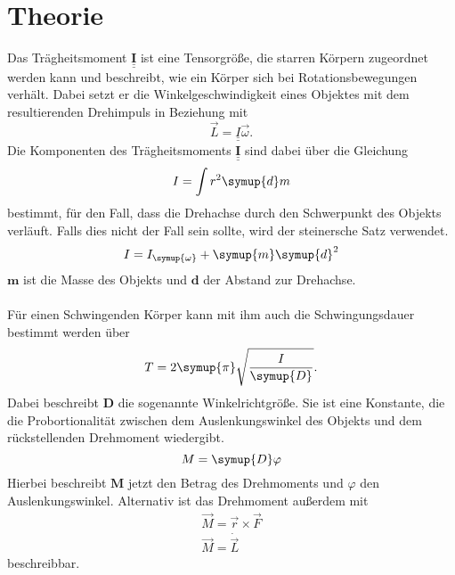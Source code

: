 \section{Theorie}
\label{sec:Theorie}
Das Trägheitsmoment $\symbf{\underline{\underline{I}}}$ ist eine Tensorgröße, die starren Körpern zugeordnet werden kann und 
beschreibt, wie ein Körper sich bei Rotationsbewegungen verhält.
Dabei setzt er die Winkelgeschwindigkeit eines Objektes mit dem resultierenden Drehimpuls in Beziehung mit
\begin{equation}
    \vec{L}=\underline{\underline{I}} \vec{\omega} \text{.}
    \label{eqn:Dreh1}
\end{equation}
Die Komponenten des Trägheitsmoments $\symbf{\underline{\underline{I}}}$ sind dabei über die Gleichung
\begin{equation}
    I=\int r^2 \symup{d}m
    \label{eqn:Trägheit}
\end{equation}
bestimmt, für den Fall, dass die Drehachse durch den Schwerpunkt des Objekts verläuft. 
Falls dies nicht der Fall sein sollte, wird der steinersche Satz verwendet.
\begin{equation}
    I=I_{\symup{\omega}}+\symup{m} \symup{d}^2
    \label{eqn:Steiner}
\end{equation}   
$\symbf{m}$ ist die Masse des Objekts und $\symbf{d}$ der Abstand zur Drehachse. \\
\\
Für einen Schwingenden Körper kann mit ihm auch die Schwingungsdauer bestimmt werden über
\begin{equation}
    T=2 \symup{\pi} \sqrt{\frac{I}{\symup{D}}}\text{.}
    \label{eqn:Schwingungsdauer}
\end{equation}
Dabei beschreibt $\symbf{D}$ die sogenannte Winkelrichtgröße. Sie ist eine Konstante, die die Probortionalität zwischen dem 
Auslenkungswinkel des Objekts und dem rückstellenden Drehmoment wiedergibt.
\begin{equation}
    M=\symup{D} \varphi %
    \label{eqn:Drehmom1}
\end{equation} 
Hierbei beschreibt $\symbf{M}$ jetzt den Betrag des Drehmoments und $\varphi$ den Auslenkungswinkel.
Alternativ ist das Drehmoment außerdem mit
\begin{gather}
    \vec{M}=\vec{r} \times \vec{F} \\ \vec{M}=\dot{\vec{L}}
    \label{eqn:Drehmom2}
\end{gather}
beschreibbar.

